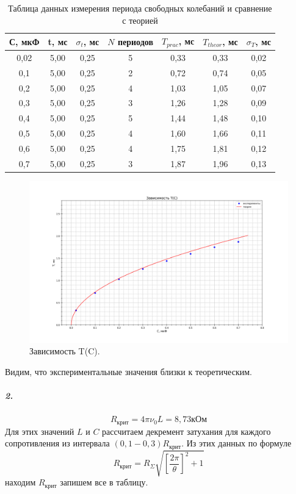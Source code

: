 \documentclass[a4paper,12pt]{article}
\begin{document}
\begin{table}[h!]
\begin{center}
\begin{tabular}{|c|c|c|c|c|c|c|}
\hline
С, мкФ & t, мс & $\sigma_t$, мс & $N$ периодов & $T_{prac}$, мс & $T_{theor}$, мс & $\sigma_T$, мс \\ \hline
0,02    & 5,00   & 0,25            & 5          & 0,33           & 0,33            & 0,02           \\ \hline
0,1    & 5,00   & 0,25           & 2           & 0,72           & 0,74           & 0,05           \\ \hline
0,2    & 5,00   & 0,25            & 4           & 1,03         & 1,05          & 0,07           \\ \hline
0,3    & 5,00   & 0,25            & 3         & 1,26           & 1,28            & 0,09           \\ \hline
0,4    & 5,00   & 0,25            & 5         & 1,44           & 1,48           & 0,10           \\ \hline
0,5    & 5,00   & 0,25            & 4         & 1,60           & 1,66            & 0,11           \\ \hline
0,6    & 5,00   & 0,25            & 4         & 1,75           & 1,81            & 0,12           \\ \hline
0,7    & 5,00   & 0,25            & 3          & 1,87           & 1,96            & 0,13           \\ \hline
\end{tabular}
\caption{Таблица данных измерения периода свободных колебаний и сравнение с теорией}
\end{center}
\end{table} 
\newpage
\begin{figure}[!h]
\centering
\includegraphics[width=0.9\linewidth]{graph1.png}
\caption{Зависимость T(C).}
\label{fig:mpr}
\end{figure}
Видим, что экспериментальные значения близки к теоретическим.
\subparagraph{2.} 
\[R_{крит} = 4\pi \nu_{0} L = 8,73 \text{кОм}\]
Для этих значений $L$ и $C$ рассчитаем декремент затухания для каждого сопротивления из интервала $(0,1-0,3)R_{крит}$. Из этих данных по формуле 
\[R_{крит} = R_{\Sigma} \sqrt{\left[\dfrac{2\pi}{\theta}\right]^2 + 1}\]
находим $R_{крит}$ запишем все в таблицу. 
\end{document}
